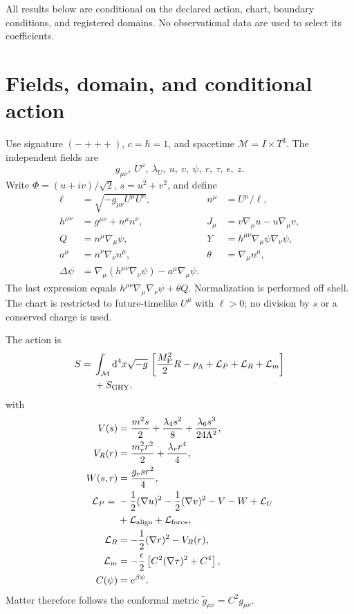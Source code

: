 \documentclass[aps,prd,reprint,superscriptaddress,nofootinbib,floatfix]{revtex4-2}
\newcommand{\Tthree}{T^{3}}
\newcommand{\Mpl}{M_{\mathrm P}}
\newcommand{\dd}{\mathrm{d}}
\begin{document}
All results below are conditional on the declared action, chart, boundary
conditions, and registered domains.  No observational data are used to select
its coefficients.

\section{Fields, domain, and conditional action}
\label{sec:action}

Use signature \((-+++)\), \(c=\hbar=1\), and spacetime
\(\mathcal M=I\times\Tthree\).  The independent fields are
\[
 g_{\mu\nu},\ U^\mu,\ \lambda_U,\ u,\ v,\ \psi,\ r,\ \tau,\ \epsilon,\ z .
\]
Write \(\Phi=(u+iv)/\sqrt2\), \(s=u^2+v^2\), and define
\begin{align}
 \ell&=\sqrt{-g_{\mu\nu}U^\mu U^\nu},&
 n^\mu&=U^\mu/\ell,\\
 h^{\mu\nu}&=g^{\mu\nu}+n^\mu n^\nu,&
 J_\mu&=v\nabla_\mu u-u\nabla_\mu v,\\
 Q&=n^\mu\nabla_\mu\psi,&
 Y&=h^{\mu\nu}\nabla_\mu\psi\nabla_\nu\psi,\\
 a^\mu&=n^\nu\nabla_\nu n^\mu,&
 \theta&=\nabla_\mu n^\mu,\\
 \Delta\psi&=\nabla_\mu(h^{\mu\nu}\nabla_\nu\psi)
              -a^\mu\nabla_\mu\psi .
\end{align}
The last expression equals
\(h^{\mu\nu}\nabla_\mu\nabla_\nu\psi+\theta Q\).  Normalization is performed
off shell.  The chart is restricted to future-timelike \(U^\mu\) with
\(\ell>0\); no division by \(s\) or a conserved charge is used.

The action is
\begin{align}
 S={}&\int_{\mathcal M}\dd^4x\sqrt{-g}\,
 \left[\frac{\Mpl^2}{2}R-\rho_\Lambda
 +\mathcal L_P+\mathcal L_R+\mathcal L_m\right]\nonumber\\
 &+S_{\rm GHY},
 \label{eq:action}
\end{align}
with
\begin{align}
 V(s)&=\frac{m^2s}{2}+\frac{\lambda_4s^2}{8}
       +\frac{\lambda_6s^3}{24\Lambda^2},\\
 V_R(r)&=\frac{m_r^2r^2}{2}+\frac{\lambda_rr^4}{4},\\
 W(s,r)&=\frac{g_rsr^2}{4},\\
 \mathcal L_P={}&-\frac12(\nabla u)^2-\frac12(\nabla v)^2
 -V-W+\mathcal L_U\nonumber\\
 &+\mathcal L_{\rm align}+\mathcal L_{\rm force},\\
 \mathcal L_R&=-\frac12(\nabla r)^2-V_R(r),\\
 \mathcal L_m&=-\frac{\epsilon}{2}
 \left[C^2(\nabla\tau)^2+C^4\right],\\
 C(\psi)&=e^{\beta\psi}.
 \label{eq:sector-lagrangians}
\end{align}
Matter therefore follows the conformal metric
\(\widetilde g_{\mu\nu}=C^2g_{\mu\nu}\).
\end{document}
